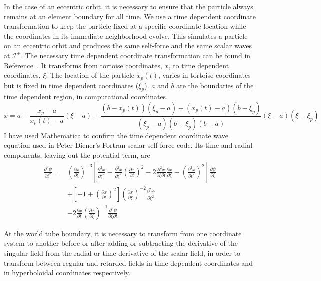 In the case of an eccentric orbit, it is necessary to ensure that the particle always remains at an element boundary for all time. We use a time dependent coordinate transformation to keep the particle fixed at a specific coordinate location while the coordinates in its immediate neighborhood evolve. This simulates a particle on an eccentric orbit and produces the same self-force and the same scalar waves at $\mathcal{I}^+$. The necessary time dependent coordinate transformation can be found in Reference~\cite{time_dependent_coordinate_transformation}. It transforms from tortoise coordinates, $x$, to time dependent coordinates, $\xi$. The location of the particle $x_p(t)$, varies in tortoise coordinates but is fixed in time dependent coordinates ($\xi_p$). $a$ and $b$ are the boundaries of the time dependent region, in computational coordinates. 
\begin{equation}
  x=a+\frac{x_p-a}{x_p(t)-a}(\xi-a)+\frac{(b-x_p(t))(\xi_p-a)-(x_p(t)-a)(b-\xi_p)}{(\xi_p-a)(b-\xi_p)(b-a)}(\xi-a)(\xi-\xi_p)
\end{equation}
I have used Mathematica to confirm the time dependent coordinate wave equation used in Peter Diener's Fortran scalar self-force code. Its time and radial components, leaving out the potential term, are
\begin{eqnarray}
\frac{\partial^2\psi}{\partial t^2}=&\left(\frac{\partial x}{\partial \xi}\right)^{-3}\left[\frac{\partial^2x}{\partial\xi^2}-\frac{\partial^2x}{\partial\xi^2}\left(\frac{\partial x}{\partial t}\right)^2-2\frac{\partial^2x}{\partial\xi \partial t}\frac{\partial x}{\partial \xi}-\left(\frac{\partial ^2x}{\partial t^2}\right)^2\right]\frac{\partial \psi}{\partial \xi}\nonumber\\
&+\left[-1+\left(\frac{\partial x}{\partial t}\right)^2\right]\left(\frac{\partial x}{\partial \xi}\right)^{-2}\frac{\partial^2\psi}{\partial\xi^2}\nonumber\\
&-2\frac{\partial x}{\partial t}\left(\frac{\partial x}{\partial \xi}\right)^{-1}\frac{\partial ^2\psi}{\partial \xi \partial t}
\end{eqnarray}

At the world tube boundary, it is necessary to transform from one coordinate system to another before or after adding or subtracting the derivative of the singular field from the radial or time derivative of the scalar field, in order to transform between regular and retarded fields in time dependent coordinates and in hyperboloidal coordinates respectively. 


